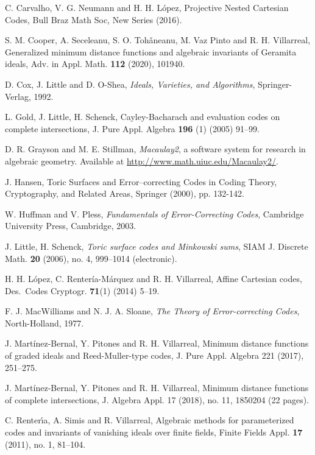 \documentclass[12pt]{amsart}
\theoremstyle{plain}
\begin{document}
\begin{thebibliography}{99}

 C. Carvalho, V. G. Neumann and H. H. L\'opez,
Projective Nested Cartesian Codes,
Bull Braz Math Soc, New Series (2016).

 S. M. Cooper, A. Seceleanu, S. O. Toh\v{a}neanu,
M. Vaz Pinto and R. H. Villarreal, 
Generalized minimum distance functions and algebraic invariants of
Geramita ideals, Adv. in Appl. Math. {\bf 112} (2020), 101940.

D. Cox, J. Little and D. O-Shea,
{\it Ideals, Varieties, and Algorithms}, Springer-Verlag, 1992.

 L. Gold, J. Little, H. Schenck,
{Cayley-Bacharach and evaluation codes on complete intersections},
 J. Pure Appl. Algebra  {\bf 196} (1) (2005) 91--99.

 D. R. Grayson and M. E. Stillman,
{\it Macaulay2}, a software system for research in algebraic geometry.
Available at \url{http://www.math.uiuc.edu/Macaulay2/}.

 J. Hansen, { Toric Surfaces and Error--correcting
    Codes} in Coding Theory, Cryptography, and Related Areas, Springer
 (2000), pp. 132-142.

 W. Huffman and V. Pless,
{\it Fundamentals of Error-Correcting Codes},
Cambridge University Press, Cambridge, 2003.

 J. Little, H. Schenck,
{\em Toric surface codes and Minkowski sums},
SIAM J. Discrete Math. {\bf  20}  (2006),  no. 4, 999--1014 (electronic).

 H. H. L\'opez, C. Renter\'ia-M\'arquez and R. H. Villarreal,
Affine Cartesian codes,
Des.\ Codes Cryptogr. \textbf{71}(1) (2014) 5--19.

 F. J. MacWilliams and N. J. A. Sloane, 
{\it The Theory of Error-correcting Codes}, North-Holland, 1977.

 J. Mart\'inez-Bernal, Y. Pitones and R. H. Villarreal,
Minimum distance functions of graded ideals and Reed-Muller-type codes,
J. Pure Appl. Algebra 221 (2017), 251--275.


 J. Mart\'inez-Bernal, Y. Pitones and R. H. Villarreal,
Minimum distance functions of complete intersections,
J. Algebra Appl. 17 (2018), no. 11, 1850204 (22 pages).

 C. Renter\'\i a, A. Simis and R. Villarreal,
Algebraic methods for parameterized codes and invariants of vanishing ideals over finite fields,
Finite Fields Appl. {\bf 17} (2011), no. 1, 81--104.


\end{thebibliography}
\end{document}
